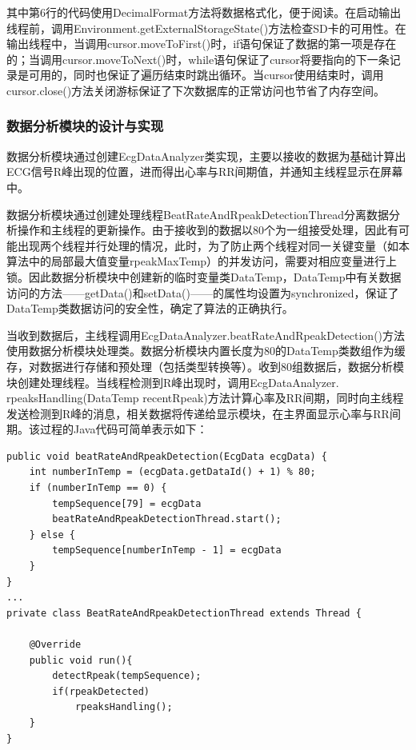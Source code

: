 其中第6行的代码使用DecimalFormat方法将数据格式化，便于阅读。在启动输出线程前，调用Environment.getExternalStorageState()方法检查SD卡的可用性。在输出线程中，当调用cursor.moveToFirst()时，if语句保证了数据的第一项是存在的；当调用cursor.moveToNext()时，while语句保证了cursor将要指向的下一条记录是可用的，同时也保证了遍历结束时跳出循环。当cursor使用结束时，调用cursor.close()方法关闭游标保证了下次数据库的正常访问也节省了内存空间。

\subsubsection{数据分析模块的设计与实现}
数据分析模块通过创建EcgDataAnalyzer类实现，主要以接收的数据为基础计算出ECG信号R峰出现的位置，进而得出心率与RR间期值，并通知主线程显示在屏幕中。

数据分析模块通过创建处理线程BeatRateAndRpeakDetectionThread分离数据分析操作和主线程的更新操作。由于接收到的数据以80个为一组接受处理，因此有可能出现两个线程并行处理的情况，此时，为了防止两个线程对同一关键变量（如本算法中的局部最大值变量rpeakMaxTemp）的并发访问，需要对相应变量进行上锁。因此数据分析模块中创建新的临时变量类DataTemp，DataTemp中有关数据访问的方法——getData()和setData()——的属性均设置为synchronized，保证了DataTemp类数据访问的安全性，确定了算法的正确执行。

当收到数据后，主线程调用EcgDataAnalyzer.beatRateAndRpeakDetection()方法使用数据分析模块处理类。数据分析模块内置长度为80的DataTemp类数组作为缓存，对数据进行存储和预处理（包括类型转换等）。收到80组数据后，数据分析模块创建处理线程。当线程检测到R峰出现时，调用EcgDataAnalyzer. rpeaksHandling(DataTemp recentRpeak)方法计算心率及RR间期，同时向主线程发送检测到R峰的消息，相关数据将传递给显示模块，在主界面显示心率与RR间期。该过程的Java代码可简单表示如下：

\begin{center}
\begin{lstlisting}
public void beatRateAndRpeakDetection(EcgData ecgData) {
    int numberInTemp = (ecgData.getDataId() + 1) % 80;
    if (numberInTemp == 0) {
        tempSequence[79] = ecgData
        beatRateAndRpeakDetectionThread.start();
    } else {
        tempSequence[numberInTemp - 1] = ecgData
    }
}
...
private class BeatRateAndRpeakDetectionThread extends Thread {

    @Override
    public void run(){
        detectRpeak(tempSequence);
        if(rpeakDetected)
            rpeaksHandling();
    }   
}
\end{lstlisting}
\end{center}

